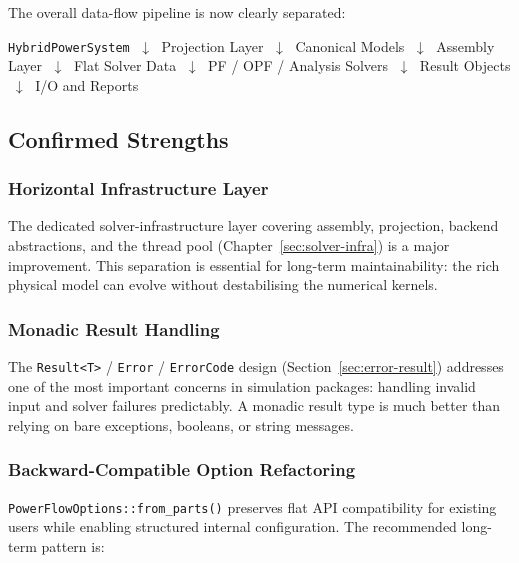 The overall data-flow pipeline is now clearly separated:

\begin{center}
\texttt{HybridPowerSystem}
$\;\downarrow\;$
Projection Layer
$\;\downarrow\;$
Canonical Models
$\;\downarrow\;$
Assembly Layer
$\;\downarrow\;$
Flat Solver Data
$\;\downarrow\;$
PF / OPF / Analysis Solvers
$\;\downarrow\;$
Result Objects
$\;\downarrow\;$
I/O and Reports
\end{center}

\subsection{Confirmed Strengths}
\label{sec:confirmed-strengths}

\subsubsection{Horizontal Infrastructure Layer}

The dedicated solver-infrastructure layer covering assembly, projection,
backend abstractions, and the thread pool (Chapter~\ref{sec:solver-infra})
is a major improvement.  This separation is essential for long-term
maintainability: the rich physical model can evolve without destabilising
the numerical kernels.

\subsubsection{Monadic Result Handling}

The \texttt{Result<T>} / \texttt{Error} / \texttt{ErrorCode} design
(Section~\ref{sec:error-result}) addresses one of the most important concerns in
simulation packages: handling invalid input and solver failures predictably.
A monadic result type is much better than relying on bare exceptions,
booleans, or string messages.

\subsubsection{Backward-Compatible Option Refactoring}

\texttt{PowerFlowOptions::from\_parts()} preserves flat API compatibility for
existing users while enabling structured internal configuration.  The
recommended long-term pattern is:

